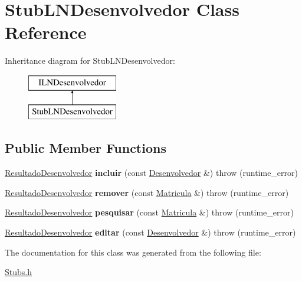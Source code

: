 \hypertarget{class_stub_l_n_desenvolvedor}{}\section{Stub\+L\+N\+Desenvolvedor Class Reference}
\label{class_stub_l_n_desenvolvedor}
Inheritance diagram for Stub\+L\+N\+Desenvolvedor\+:\begin{figure}[H]
\begin{center}
\leavevmode
\includegraphics[height=2.000000cm]{class_stub_l_n_desenvolvedor}
\end{center}
\end{figure}
\subsection*{Public Member Functions}
\begin{DoxyCompactItemize}
\item 
\hypertarget{class_stub_l_n_desenvolvedor_a7b855ccbcd35bba830f66a6333d4df8d}{}\label{class_stub_l_n_desenvolvedor_a7b855ccbcd35bba830f66a6333d4df8d} 
\hyperlink{class_resultado_desenvolvedor}{Resultado\+Desenvolvedor} {\bfseries incluir} (const \hyperlink{class_desenvolvedor}{Desenvolvedor} \&)  throw (runtime\+\_\+error)
\item 
\hypertarget{class_stub_l_n_desenvolvedor_ad73c34044c2192cd68f9a44eb1e19ac0}{}\label{class_stub_l_n_desenvolvedor_ad73c34044c2192cd68f9a44eb1e19ac0} 
\hyperlink{class_resultado_desenvolvedor}{Resultado\+Desenvolvedor} {\bfseries remover} (const \hyperlink{class_matricula}{Matricula} \&)  throw (runtime\+\_\+error)
\item 
\hypertarget{class_stub_l_n_desenvolvedor_ad4334f0a1b64ba4e764f350c1ad3943b}{}\label{class_stub_l_n_desenvolvedor_ad4334f0a1b64ba4e764f350c1ad3943b} 
\hyperlink{class_resultado_desenvolvedor}{Resultado\+Desenvolvedor} {\bfseries pesquisar} (const \hyperlink{class_matricula}{Matricula} \&)  throw (runtime\+\_\+error)
\item 
\hypertarget{class_stub_l_n_desenvolvedor_aa023e2d85ea41e9e7d6056e93088998c}{}\label{class_stub_l_n_desenvolvedor_aa023e2d85ea41e9e7d6056e93088998c} 
\hyperlink{class_resultado_desenvolvedor}{Resultado\+Desenvolvedor} {\bfseries editar} (const \hyperlink{class_desenvolvedor}{Desenvolvedor} \&)  throw (runtime\+\_\+error)
\end{DoxyCompactItemize}


The documentation for this class was generated from the following file\+:\begin{DoxyCompactItemize}
\item 
\hyperlink{_stubs_8h}{Stubs.\+h}\end{DoxyCompactItemize}
